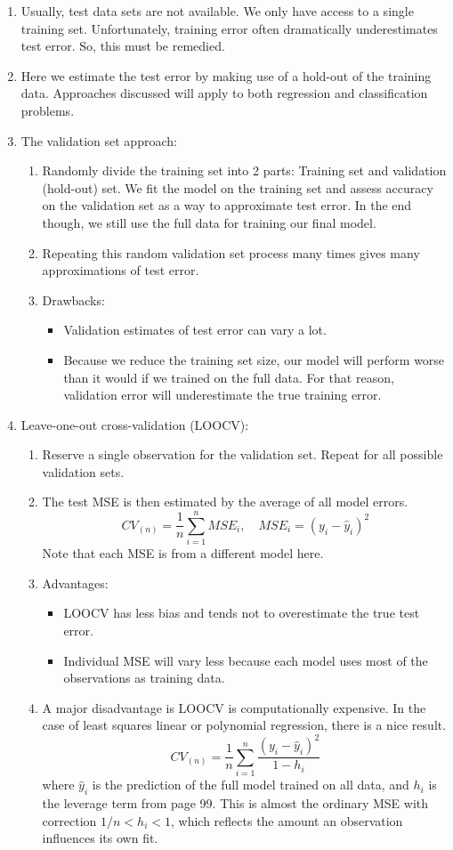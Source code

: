 \documentclass{article}
\begin{document}
\begin{enumerate}
\item Usually, test data sets are not available. We only have access to a single training set. Unfortunately, training error often dramatically underestimates test error. So, this must be remedied.

\item Here we estimate the test error by making use of a hold-out of the training data. Approaches discussed will apply to both regression and classification problems.

\item The validation set approach:
\begin{enumerate}
\item Randomly divide the training set into 2 parts: Training set and validation (hold-out) set. We fit the model on the training set and assess accuracy on the validation set as a way to approximate test error. In the end though, we still use the full data for training our final model.
\item Repeating this random validation set process many times gives many approximations of test error. 
\item Drawbacks:
\begin{itemize}
\item Validation estimates of test error can vary a lot.
\item Because we reduce the training set size, our model will perform worse than it would if we trained on the full data. For that reason, validation error will underestimate the true training error.
\end{itemize}
\end{enumerate}

\item Leave-one-out cross-validation (LOOCV):
\begin{enumerate}
\item Reserve a single observation for the validation set. Repeat for all possible validation sets. 
\item The test MSE is then estimated by the average of all model errors.
\[
CV_{(n)} = \frac{1}{n} \sum_{i=1}^n MSE_i, \quad MSE_i = (y_i-\hat{y}_i)^2
\]
Note that each MSE is from a different model here.
\item Advantages:
\begin{itemize}
\item LOOCV has less bias and tends not to overestimate the true test error. 
\item Individual MSE will vary less because each model uses most of the observations as training data.
\end{itemize}
\item A major disadvantage is LOOCV is computationally expensive. In the case of least squares linear or polynomial regression, there is a nice result.
\[
CV_{(n)} = \frac{1}{n} \sum_{i=1}^n \frac{(y_i-\hat{y}_i)^2}{1-h_i}
\]
where $\hat{y}_i$ is the prediction of the full model trained on all data, and $h_i$ is the leverage term from page 99. This is almost the ordinary MSE with correction $1/n<h_i<1$, which reflects the amount an observation influences its own fit.
\end{enumerate}


\end{enumerate}
\end{document}
